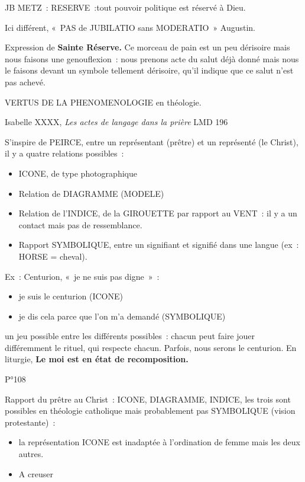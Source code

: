 JB METZ~: RESERVE~:tout pouvoir politique est réservé à Dieu.

Ici différent, «~PAS de JUBILATIO sans MODERATIO~» Augustin.

Expression de \textbf{Sainte Réserve.} Ce morceau de pain est un peu
dérisoire mais nous faisons une genouflexion~: nous prenons acte du
salut déjà donné mais nous le faisons devant un symbole tellement
dérisoire, qu'il indique que ce salut n'est pas achevé.

VERTUS DE LA PHENOMENOLOGIE en théologie.

Isabelle XXXX, \emph{Les actes de langage dans la prière} LMD 196

S'inspire de PEIRCE, entre un représentant (prêtre) et un représenté (le
Christ), il y a quatre relations possibles~:

\begin{itemize}
\item
  ICONE, de type photographique
\item
  Relation de DIAGRAMME (MODELE)
\item
  Relation de l'INDICE, de la GIROUETTE par rapport au VENT~: il y a un
  contact mais pas de ressemblance.
\item
  Rapport SYMBOLIQUE,
  entre un signifiant et signifié dans une langue (ex~: HORSE = cheval).
\end{itemize}

Ex~: Centurion, «~je ne suis pas digne~»~:

\begin{itemize}
\item
  je suis le centurion (ICONE)
\item
  je dis cela parce que l'on m'a demandé (SYMBOLIQUE)
\end{itemize}

un jeu possible entre les différents possibles~: chacun peut faire jouer
différemment le rituel, qui respecte chacun. Parfois, nous serons le
centurion. En liturgie, \textbf{Le moi est en état de recomposition.}

P°108

Rapport du prêtre au Christ~: ICONE, DIAGRAMME, INDICE, les trois sont
possibles en théologie catholique mais probablement pas SYMBOLIQUE
(vision protestante)~:

\begin{itemize}
\item
  la représentation ICONE est inadaptée à l'ordination de femme mais les
  deux autres.
\item
  A creuser
\end{itemize}


